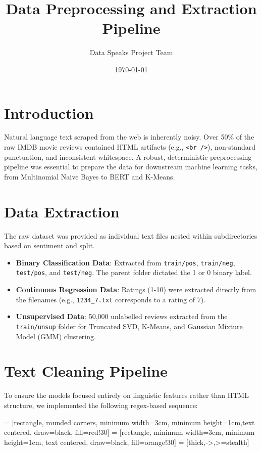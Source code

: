 \documentclass[12pt]{article}
\title{\textbf{Data Preprocessing and Extraction Pipeline}}
\author{Data Speaks Project Team}
\date{\today}
\begin{document}
\maketitle

\section{Introduction}
Natural language text scraped from the web is inherently noisy. Over 50\% of the raw IMDB movie reviews contained HTML artifacts (e.g., \texttt{<br />}), non-standard punctuation, and inconsistent whitespace. A robust, deterministic preprocessing pipeline was essential to prepare the data for downstream machine learning tasks, from Multinomial Naive Bayes to BERT and K-Means.

\section{Data Extraction}
The raw dataset was provided as individual text files nested within subdirectories based on sentiment and split.
\begin{itemize}
    \item \textbf{Binary Classification Data}: Extracted from \texttt{train/pos}, \texttt{train/neg}, \texttt{test/pos}, and \texttt{test/neg}. The parent folder dictated the 1 or 0 binary label.
    \item \textbf{Continuous Regression Data}: Ratings (1-10) were extracted directly from the filenames (e.g., \texttt{1234\_7.txt} corresponds to a rating of 7).
    \item \textbf{Unsupervised Data}: 50,000 unlabelled reviews extracted from the \texttt{train/unsup} folder for Truncated SVD, K-Means, and Gaussian Mixture Model (GMM) clustering.
\end{itemize}

\section{Text Cleaning Pipeline}
To ensure the models focused entirely on linguistic features rather than HTML structure, we implemented the following regex-based sequence:

 = [rectangle, rounded corners, minimum width=3cm, minimum height=1cm,text centered, draw=black, fill=red!30]
 = [rectangle, minimum width=3cm, minimum height=1cm, text centered, draw=black, fill=orange!30]
 = [thick,->,>=stealth]
\end{document}
